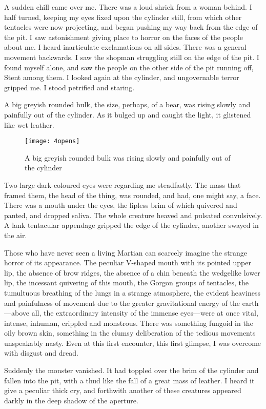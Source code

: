 A sudden chill came over me. There was a loud shriek from a woman behind. I half turned, keeping my eyes fixed upon the cylinder still, from which other tentacles were now projecting, and began pushing my way back from the edge of the pit. I saw astonishment giving place to horror on the faces of the people about me. I heard inarticulate exclamations on all sides. There was a general movement backwards. I saw the shopman struggling still on the edge of the pit. I found myself alone, and saw the people on the other side of the pit running off, Stent among them. I looked again at the cylinder, and ungovernable terror gripped me. I stood petrified and staring.

A big greyish rounded bulk, the size, perhaps, of a bear, was rising slowly and painfully out of the cylinder. As it bulged up and caught the light, it glistened like wet leather.

\begin{figure}[p]
	\centering
	\texttt{[image: 4opens]}
	\caption[A big greyish rounded bulk was rising out of the cylinder]{A big greyish rounded bulk was rising slowly and painfully out of the cylinder}
\end{figure}

Two large dark-coloured eyes were regarding me steadfastly. The mass that framed them, the head of the thing, was rounded, and had, one might say, a face. There was a mouth under the eyes, the lipless brim of which quivered and panted, and dropped saliva. The whole creature heaved and pulsated convulsively. A lank tentacular appendage gripped the edge of the cylinder, another swayed in the air.

Those who have never seen a living Martian can scarcely imagine the strange horror of its appearance. The peculiar V-shaped mouth with its pointed upper lip, the absence of brow ridges, the absence of a chin beneath the wedgelike lower lip, the incessant quivering of this mouth, the Gorgon groups of tentacles, the tumultuous breathing of the lungs in a strange atmosphere, the evident heaviness and painfulness of movement due to the greater gravitational energy of the earth—above all, the extraordinary intensity of the immense eyes—were at once vital, intense, inhuman, crippled and monstrous. There was something fungoid in the oily brown skin, something in the clumsy deliberation of the tedious movements unspeakably nasty. Even at this first encounter, this first glimpse, I was overcome with disgust and dread.

Suddenly the monster vanished. It had toppled over the brim of the cylinder and fallen into the pit, with a thud like the fall of a great mass of leather. I heard it give a peculiar thick cry, and forthwith another of these creatures appeared darkly in the deep shadow of the aperture.

